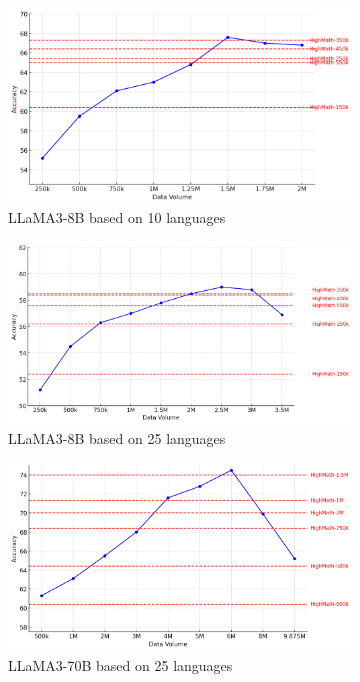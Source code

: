 \documentclass[11pt]{article}
\begin{document}
\begin{figure}[h]
    \centering
   
    \begin{subfigure}[b]{0.3\linewidth}  %
        \centering
        \includegraphics[width=\linewidth]{picture/figure5_8b_10lang.png}
        \caption{LLaMA3-8B based on 10 languages}
    \end{subfigure}
    \begin{subfigure}[b]{0.3\linewidth}
        \centering
        \includegraphics[width=\linewidth]{picture/figure5_8b_25lang.png}
        \caption{LLaMA3-8B based on 25 languages}
    \end{subfigure}
    \begin{subfigure}[b]{0.3\linewidth}
        \centering
        \includegraphics[width=\linewidth]{picture/figure5_70b_25lang.png}
        \caption{LLaMA3-70B based on 25 languages}
    \end{subfigure}
    \caption{}
\end{figure}
\end{document}
